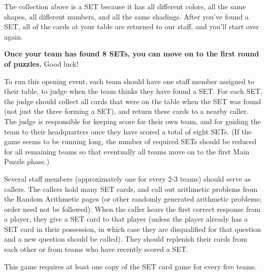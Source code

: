   The collection above is a SET because it has all different colors,
  all the same shapes, all different numbers, and all the same shadings.
  After you've found a SET, all of the cards at your table are returned
  to our staff, and you'll start over again.

  \textbf{Once your team has found 8 SETs, you can move on to the
  first round of puzzles.} Good luck!



\begin{multicols}{4}
\begin{itemize}
  
\end{itemize}
\end{multicols}



To run this opening event, each team should have one staff member assigned
to their table, to judge when the team thinks they have found a SET.
For each SET, the judge should collect all cards that were on the table when
the SET was found (not just the three forming a SET), and return these cards
to a nearby caller. The judge is responsible for keeping score for their own
team, and for guiding the team to their headquarters once they have scored
a total of eight SETs. (If the game seems to be running long, the number
of required SETs should be reduced for all remaining teams
so that eventually all teams move on to the first Main Puzzle phase.)

Several staff members (approximately one for every 2-3 teams) should serve as
callers. The callers hold many SET cards, and call out arithmetic problems
from the Random Arithmetic pages (or other randomly generated arithmetic
problems; order need not be followed).
When the caller hears the first correct response from a player, they give a
SET card to that player (unless the player already has a SET card in their
possession, in which case they are disqualified for that question and a new
question should be called). They should replenish their cards from each other
or from teams who have recently scored a SET.

This game requires at least one copy of the SET card game for every five
teams.
